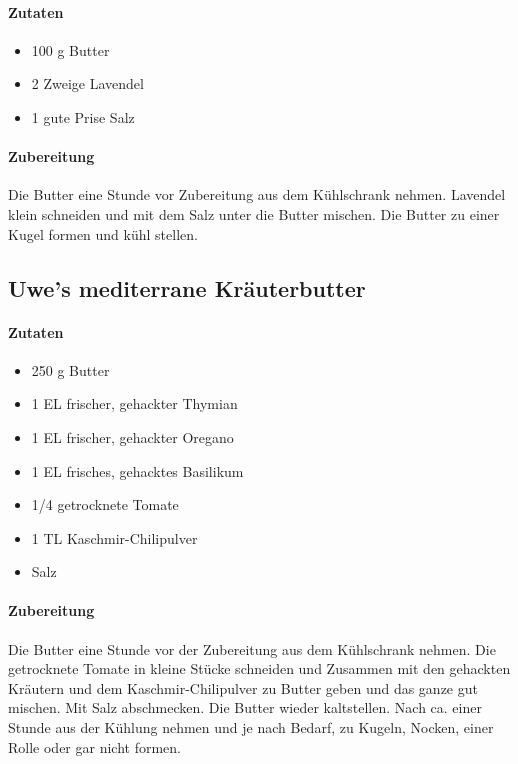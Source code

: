 \paragraph{Zutaten}

\begin{itemize}[noitemsep]
	\item 100 g Butter
	\item 2 Zweige Lavendel
	\item 1 gute Prise Salz
\end{itemize}

\paragraph{Zubereitung}

Die Butter eine Stunde vor Zubereitung aus dem Kühlschrank nehmen. Lavendel 
klein schneiden 
und mit dem Salz unter die Butter mischen. Die Butter zu einer Kugel formen 
und kühl stellen.


\subsection{Uwe's mediterrane Kräuterbutter}\label{Kräuterbutter}

\paragraph{Zutaten}

\begin{itemize}[noitemsep]
	\item 250 g Butter
	\item 1 EL frischer, gehackter Thymian 
	\item 1 EL frischer, gehackter Oregano
	\item 1 EL frisches, gehacktes Basilikum
	\item 1/4 getrocknete Tomate
	\item 1 TL Kaschmir-Chilipulver
	\item Salz
\end{itemize}

\paragraph{Zubereitung}

Die Butter eine Stunde vor der Zubereitung aus dem Kühlschrank nehmen. Die 
getrocknete Tomate in kleine Stücke schneiden und Zusammen mit den 
gehackten Kräutern und dem Kaschmir-Chilipulver zu Butter geben und das 
ganze gut mischen. Mit Salz abschmecken. Die Butter wieder kaltstellen. Nach 
ca. einer Stunde aus der Kühlung nehmen und je nach Bedarf, zu Kugeln, 
Nocken, einer Rolle oder gar nicht formen. 
	
